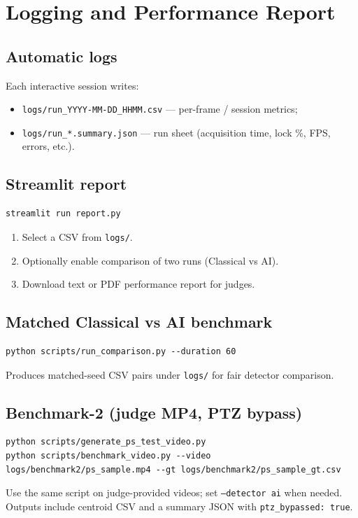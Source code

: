\documentclass[11pt,a4paper]{article}
\begin{document}
\section{Logging and Performance Report}
\label{sec:report}

\subsection{Automatic logs}
Each interactive session writes:
\begin{itemize}
  \item \texttt{logs/run\_YYYY-MM-DD\_HHMM.csv} --- per-frame / session metrics;
  \item \texttt{logs/run\_*.summary.json} --- run sheet (acquisition time, lock \%, FPS, errors, etc.).
\end{itemize}

\subsection{Streamlit report}
\begin{lstlisting}
streamlit run report.py
\end{lstlisting}
\begin{enumerate}
  \item Select a CSV from \texttt{logs/}.
  \item Optionally enable comparison of two runs (Classical vs AI).
  \item Download text or PDF performance report for judges.
\end{enumerate}

\subsection{Matched Classical vs AI benchmark}
\begin{lstlisting}
python scripts/run_comparison.py --duration 60
\end{lstlisting}
Produces matched-seed CSV pairs under \texttt{logs/} for fair detector comparison.

\subsection{Benchmark-2 (judge MP4, PTZ bypass)}
\begin{lstlisting}
python scripts/generate_ps_test_video.py
python scripts/benchmark_video.py --video logs/benchmark2/ps_sample.mp4 --gt logs/benchmark2/ps_sample_gt.csv
\end{lstlisting}
Use the same script on judge-provided videos; set \texttt{--detector ai} when needed.
Outputs include centroid CSV and a summary JSON with \texttt{ptz\_bypassed: true}.
\end{document}

